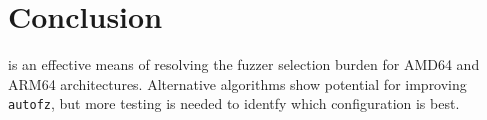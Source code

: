 \section{Conclusion}
 is an effective means of resolving the fuzzer selection burden for AMD64 
and ARM64 architectures. Alternative algorithms show potential for improving 
\texttt{autofz}, but more testing is needed to identfy which configuration is best.